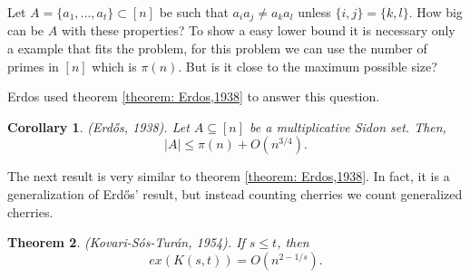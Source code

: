 \documentclass[12pt,twoside,a4paper]{book}
\numberwithin{equation}{section}
\newtheorem{theorem}             {Theorem}[section]
\newtheorem{corollary}	[theorem] {Corollary}
\theoremstyle{remark}
\begin{document}
Let $A = \{a_1,...,a_t\} \subset [n]$ be such that $a_ia_j \neq a_ka_l$ unless $\{i,j\} = \{k,l\}$. How big can be $A$ with these properties?
To show a easy lower bound it is necessary only a example that fits the problem, for this problem we can use the number of primes in $[n]$ which is $\pi (n)$. But is it close to the maximum possible size?

Erdos used theorem \ref{theorem: Erdos,1938} to answer this question.

\begin{corollary}(Erd\H{o}s, 1938). Let $A\subseteq [n]$ be a multiplicative Sidon set. Then,
$$ |A| \leq \pi(n) + O(n^{3/4}). $$

\end{corollary}
The next result is very similar to theorem \ref{theorem: Erdos,1938}. In fact, it is a generalization of Erd\H{o}s' result, but instead counting cherries we count generalized cherries.
\begin{theorem}(Kovari-Sós-Turán, 1954). If $s \leq t$, then
$$ ex(K(s,t)) = O (n^{2 - 1/s}). $$
\end{theorem}
\end{document}
